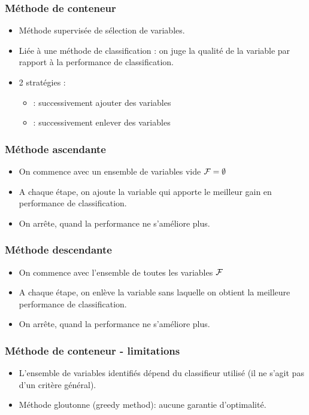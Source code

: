 \begin{frame}
  \frametitle{Méthode de conteneur}
  \begin{itemize}
  	\item Méthode supervisée de sélection de variables. 
  	\item Liée à une méthode de classification : on juge la qualité de la variable par rapport à la performance de classification.
  	\item 2 stratégies : 
  	\begin{itemize}
  		\item {}: successivement ajouter des variables
  		\item {}: successivement enlever des variables
  	\end{itemize}
  \end{itemize}
\end{frame}

\begin{frame}
  \frametitle{Méthode ascendante}
  \begin{itemize}
  	\item On commence avec un ensemble de variables vide $\mathcal{F} = \emptyset$
  	\item A chaque étape, on ajoute la variable qui apporte le meilleur gain en performance de classification.
  	\item On arrête, quand la performance ne s'améliore plus. 
  \end{itemize}
\end{frame}

\begin{frame}
  \frametitle{Méthode descendante}
  \begin{itemize}
  	\item On commence avec l'ensemble de toutes les variables $\mathcal{F}$
  	\item A chaque étape, on enlève la variable sans laquelle on obtient la meilleure performance de classification.
  	\item On arrête, quand la performance ne s'améliore plus. 
  \end{itemize}
\end{frame}

\begin{frame}
  \frametitle{Méthode de conteneur - limitations}
  \begin{itemize}
  	\item L'ensemble de variables identifiés dépend du classifieur utilisé (il ne s'agit pas d'un critère général). 
  	\item Méthode gloutonne (greedy method): aucune garantie d'optimalité. 
  \end{itemize}
\end{frame}

